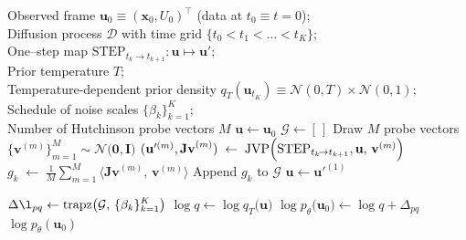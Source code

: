 \documentclass[%
aip,
 amsmath,amssymb,
reprint,%
twocolumn,
]{revtex4-1}
\begin{document}
{\begin{algorithm}[H]
  \caption{Likelihood estimation for a thermodynamic map (diffusion model) using the Hutchinson trace estimator}
  \label{alg:diffusion-likelihood}
  \begin{algorithmic}[1]
    \REQUIRE Observed frame $\mathbf{u}_{0}\equiv (\mathbf{x}_0, U_0)^\top$ (data at $t_0\equiv t={0}$); \\
    Diffusion process $\mathcal{D}$ with time grid $\{t_{0}\!\!<\!\!t_{1}\!\!<\!\!\dots\!\!<\!\!t_{K}\}$; \\
    One–step map $\mathrm{STEP}_{t_{k}\!\rightarrow t_{k+1}} \colon \mathbf{u}\!\mapsto\!\mathbf{u}'$;  \\
    Prior temperature $T$;  \\
    Temperature-dependent prior density $q_T(\mathbf{u}_{t_K})\equiv \mathcal{N}(0,T) \times \mathcal{N}(0,1)$;  \\
    Schedule of noise scales $\{\beta_{k}\}_{k=1}^{K}$; \\
    Number of Hutchinson probe vectors $M$
    \STATE $\mathbf{u}\leftarrow\mathbf{u}_{0}$  
    \STATE $\mathcal{G}\leftarrow[\,]$          
      \STATE Draw $M$ probe vectors
             $\bigl\{\mathbf{v}^{(m)}\bigr\}_{m=1}^{M}
                    \sim\mathcal{N}\bigl(\mathbf{0},\mathbf{I}\bigr)$
        \STATE $(\mathbf{u}'^{(m)},\mathbf{Jv}^{(m)})\;
               \leftarrow\;
               \mathrm{JVP}\Bigl(
                 \mathrm{STEP}_{t_{k}\!\rightarrow t_{k+1}},
                 \mathbf{u},\,
                 \mathbf{v}^{(m)}
               \Bigr)$ 
      \ENDFOR
      \STATE $\displaystyle
             g_{k}\;\leftarrow\;
             \frac{1}{M}
             \sum_{m=1}^{M}
               \bigl\langle
                 \mathbf{Jv}^{(m)},\,\mathbf{v}^{(m)}
               \bigr\rangle$
      \STATE Append $g_{k}$ to $\mathcal{G}$
      \STATE $\mathbf{u}\leftarrow\mathbf{u}'^{(1)}$ 
    \ENDFOR

    \STATE $\displaystyle
           \Delta \l_{pq}
           \leftarrow
           \operatorname{trapz}\bigl(\mathcal{G},\,
                                    \{\beta_{k}\}_{k=1}^{K}\bigr)$
    \STATE $\displaystyle
           \log q
           \leftarrow
           \log q_T\bigl(\mathbf{u}\bigr)$
    \STATE $\displaystyle
           \log p_{\theta}\bigl(\mathbf{u}_{0}\bigr)
           \leftarrow
           \log q + \Delta_{pq}$
    \RETURN $\log p_{\theta}(\mathbf{u}_{0})$
  \end{algorithmic}
\end{algorithm}

}
\end{document}
